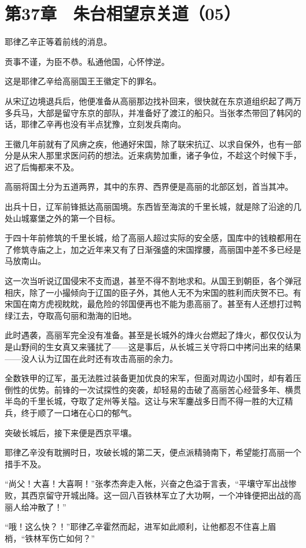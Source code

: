\section{第37章　朱台相望京关道（05）}

耶律乙辛正等着前线的消息。

贡事不谨，为臣不恭。私通他国，心怀悖逆。

这是耶律乙辛给高丽国王王徽定下的罪名。

从宋辽边境退兵后，他便准备从高丽那边找补回来，很快就在东京道组织起了两万多兵马，大部是留守东京的部队，并准备好了渡江的船只。当张孝杰带回了韩冈的话，耶律乙辛再也没有半点犹豫，立刻发兵南向。

王徽几年前就有了风痹之疾，他通好宋国，除了联宋抗辽、以求自保外，也有一部分是从宋人那里求医问药的想法。近来病势加重，诸子争位，不趁这个时候下手，迟了后悔都来不及。

高丽将国土分为五道两界，其中的东界、西界便是高丽的北部区划，首当其冲。

出兵十日，辽军前锋抵达高丽国境。东西皆至海滨的千里长城，就是除了沿途的几处山城寨堡之外的第一个目标。

于四十年前修筑的千里长城，给了高丽人超过实际的安全感，国库中的钱粮都用在了修筑寺庙之上，加之近年来又有了日渐强盛的宋国撑腰，高丽国中差不多已经是马放南山。

这一次当听说辽国侵宋不支而退，甚至不得不割地求和。从国王到朝臣，各个弹冠相庆，除了一小撮倾向于辽国的臣子外，其他人无不为宋国的胜利而庆贺不已。有宋国在南方虎视眈眈，最危险的邻国便再也不能为患高丽了。甚至有人还想打过鸭绿江去，夺取高句丽和渤海的旧地。

此时遇袭，高丽军完全没有准备。甚至是长城外的烽火台燃起了烽火，都仅仅认为是山野间的生女真又来骚扰了——这是事后，从长城三关守将口中拷问出来的结果——没人认为辽国在此时还有攻击高丽的余力。

全数铁甲的辽军，虽无法胜过装备更加优良的宋军，但面对周边小国时，却有着压倒性的优势。前锋的一次试探性的突袭，却轻易的击破了高丽苦心经营多年、横贯半岛的千里长城，夺取了定州等关隘。这让与宋军鏖战多日而不得一胜的大辽精兵，终于顺了一口堵在心口的郁气。

突破长城后，接下来便是西京平壤。

耶律乙辛没有耽搁时日，攻破长城的第二天，便点派精骑南下，希望能打高丽一个措手不及。

“尚父！大喜！大喜啊！”张孝杰奔走入帐，兴奋之色溢于言表，“平壤守军出战惨败，其西京留守开城出降。这一回八百铁林军立了大功啊，一个冲锋便把出战的高丽人给冲散了！”

“哦！这么快？！”耶律乙辛霍然而起，进军如此顺利，让他都忍不住喜上眉梢，“铁林军伤亡如何？”


